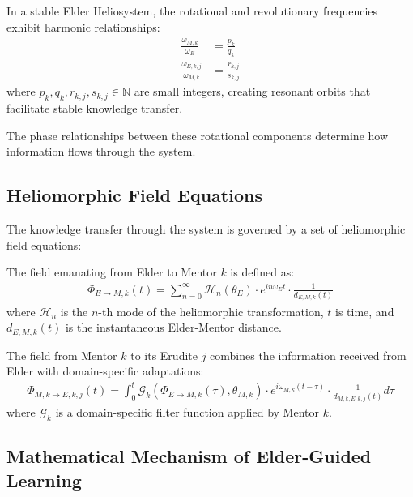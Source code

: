 \begin{theorem}
In a stable Elder Heliosystem, the rotational and revolutionary frequencies exhibit harmonic relationships:
\begin{align}
\frac{\omega_{M,k}}{\omega_E} &= \frac{p_k}{q_k} \\
\frac{\omega_{E,k,j}}{\omega_{M,k}} &= \frac{r_{k,j}}{s_{k,j}}
\end{align}
where $p_k, q_k, r_{k,j}, s_{k,j} \in \mathbb{N}$ are small integers, creating resonant orbits that facilitate stable knowledge transfer.
\end{theorem}

The phase relationships between these rotational components determine how information flows through the system.

\subsection{Heliomorphic Field Equations}

The knowledge transfer through the system is governed by a set of heliomorphic field equations:

\begin{definition}
The field emanating from Elder to Mentor $k$ is defined as:
\begin{align}
\Phi_{E \rightarrow M,k}(t) = \sum_{n=0}^{\infty} \mathcal{H}_n(\theta_E) \cdot e^{in\omega_E t} \cdot \frac{1}{d_{E,M,k}(t)}
\end{align}
where $\mathcal{H}_n$ is the $n$-th mode of the heliomorphic transformation, $t$ is time, and $d_{E,M,k}(t)$ is the instantaneous Elder-Mentor distance.
\end{definition}

\begin{definition}
The field from Mentor $k$ to its Erudite $j$ combines the information received from Elder with domain-specific adaptations:
\begin{align}
\Phi_{M,k \rightarrow E,k,j}(t) = \int_0^t \mathcal{G}_k(\Phi_{E \rightarrow M,k}(\tau), \theta_{M,k}) \cdot e^{i\omega_{M,k}(t-\tau)} \cdot \frac{1}{d_{M,k,E,k,j}(t)} d\tau
\end{align}
where $\mathcal{G}_k$ is a domain-specific filter function applied by Mentor $k$.
\end{definition}

\subsection{Mathematical Mechanism of Elder-Guided Learning}

